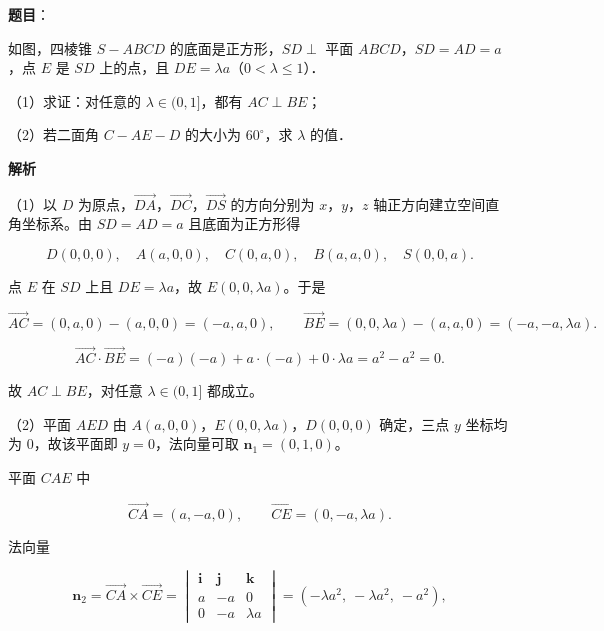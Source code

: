 \begin{answer}

\textbf{题目}：

如图，四棱锥 $S-ABCD$ 的底面是正方形，$SD\perp$ 平面 $ABCD$，$SD=AD=a$，点 $E$ 是 $SD$ 上的点，且 $DE=\lambda a$（$0<\lambda\leqslant1$）．

（1）求证：对任意的 $\lambda\in(0,1]$，都有 $AC\perp BE$；

（2）若二面角 $C-AE-D$ 的大小为 $60^\circ$，求 $\lambda$ 的值．
\nopagebreak[4]
\begin{center}\end{center}
\nopagebreak[4]
\textbf{解析}

（1）以 $D$ 为原点，$\overrightarrow{DA}$，$\overrightarrow{DC}$，$\overrightarrow{DS}$ 的方向分别为 $x$，$y$，$z$ 轴正方向建立空间直角坐标系。由 $SD=AD=a$ 且底面为正方形得

\nopagebreak[4]
\[D(0,0,0),\quad A(a,0,0),\quad C(0,a,0),\quad B(a,a,0),\quad S(0,0,a).\]

点 $E$ 在 $SD$ 上且 $DE=\lambda a$，故 $E(0,0,\lambda a)$。于是

\nopagebreak[4]
\[\overrightarrow{AC}=(0,a,0)-(a,0,0)=(-a,a,0),\qquad
\overrightarrow{BE}=(0,0,\lambda a)-(a,a,0)=(-a,-a,\lambda a).\]

\nopagebreak[4]
\[\overrightarrow{AC}\cdot\overrightarrow{BE}=(-a)(-a)+a\cdot(-a)+0\cdot\lambda a=a^2-a^2=0.\]

故 $AC\perp BE$，对任意 $\lambda\in(0,1]$ 都成立。

（2）平面 $AED$ 由 $A(a,0,0)$，$E(0,0,\lambda a)$，$D(0,0,0)$ 确定，三点 $y$ 坐标均为 $0$，故该平面即 $y=0$，法向量可取 $\boldsymbol n_1=(0,1,0)$。

平面 $CAE$ 中

\nopagebreak[4]
\[\overrightarrow{CA}=(a,-a,0),\qquad \overrightarrow{CE}=(0,-a,\lambda a).\]

法向量

\nopagebreak[4]
\[\boldsymbol n_2=\overrightarrow{CA}\times\overrightarrow{CE}
=\begin{vmatrix}\boldsymbol i&\boldsymbol j&\boldsymbol k\\ a&-a&0\\ 0&-a&\lambda a\end{vmatrix}
=(-\lambda a^2,\ -\lambda a^2,\ -a^2),\]


\end{answer}
